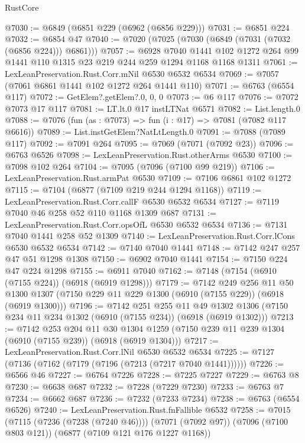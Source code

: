 \begin{lexlean}{RustCore}
\begin{coremodule}
@7030 := @6849 (@6851 @229 (@6962 (@6856 @229)))
@7031 := @6851 @224
@7032 := @6854 @47
@7040 := @7020 (@7025 (@7030 (@6849 (@7031 (@7032 (@6856 @224))) @6861)))
@7057 := @6928
    @7040
    @1441
    @102
    @1272
    @264
    @99
    @1441
    @110
    @1315
    @23
    @219
    @244
    @259
    @1294
    @1168
    @1168
    @1311
@7061 := LexLeanPreservation.Rust.Corr.mNil @6530 @6532 @6534
@7069 := @7057 (@7061 @6861 @1441 @102 @1272 @264 @1441 @110)
@7071 := @6763 (@6554 @117)
@7072 := GetElem?.getElem?.{0, 0, 0}
@7073 := @6 @117
@7076 := @7072 @7073 @17 @117
@7081 := LT.lt.{0} @17 instLTNat @6571
@7082 := List.length.{0}
@7088 := @7076 (fun (as : @7073) => fun (i : @17) => @7081 (@7082 @117 @6616))
@7089 := List.instGetElem?NatLtLength.{0}
@7091 := @7088 (@7089 @117)
@7092 := @7091 @264
@7095 := @7069 (@7071 (@7092 @23))
@7096 := @6763 @6526
@7098 := LexLeanPreservation.Rust.otherArms @6530
@7100 := @7098 @102 @264
@7104 := @7095 (@7096 (@7100 @99 @219))
@7106 := LexLeanPreservation.Rust.armPat @6530
@7109 := @7106 @6861 @102 @1272
@7115 := @7104 (@6877 (@7109 @219 @244 @1294 @1168))
@7119 := LexLeanPreservation.Rust.Corr.callF @6530 @6532 @6534
@7127 := @7119 @7040 @46 @258 @52 @110 @1168 @1309 @687
@7131 := LexLeanPreservation.Rust.Corr.opsOfL @6530 @6532 @6534
@7136 := @7131 @7040 @1441 @258 @52 @1309
@7140 := LexLeanPreservation.Rust.Corr.lCons @6530 @6532 @6534
@7142 := @7140 @7040 @1441
@7148 := @7142 @247 @257 @47 @51 @1298 @1308
@7150 := @6902 @7040 @1441
@7154 := @7150 @224 @47 @224 @1298
@7155 := @6911 @7040
@7162 := @7148 (@7154 (@6910 (@7155 @224)) (@6918 (@6919 @1298)))
@7179 := @7142
    @249
    @256
    @11
    @50
    @1300
    @1307
    (@7150 @229 @11 @229 @1300 (@6910 (@7155 @229)) (@6918 (@6919 @1300)))
@7196 := @7142
    @251
    @255
    @11
    @49
    @1302
    @1306
    (@7150 @234 @11 @234 @1302 (@6910 (@7155 @234)) (@6918 (@6919 @1302)))
@7213 := @7142
    @253
    @204
    @11
    @30
    @1304
    @1259
    (@7150 @239 @11 @239 @1304 (@6910 (@7155 @239)) (@6918 (@6919 @1304)))
@7217 := LexLeanPreservation.Rust.Corr.lNil @6530 @6532 @6534
@7225 := @7127 (@7136 (@7162 (@7179 (@7196 (@7213 (@7217 @7040 @1441))))))
@7226 := @6566 @46
@7227 := @6764 @7226
@7228 := @7225 @7227
@7229 := @6763 @8
@7230 := @6638 @687
@7232 := @7228 (@7229 @7230)
@7233 := @6763 @7
@7234 := @6662 @687
@7236 := @7232 (@7233 @7234)
@7238 := @6763 (@6554 @6526)
@7240 := LexLeanPreservation.Rust.fnFallible @6532
@7258 := @7015
    (@7115 (@7236 (@7238 (@7240 @46))))
    (@7071 (@7092 @97))
    (@7096 (@7100 @803 @121))
    (@6877 (@7109 @121 @176 @1227 @1168))

\end{coremodule}
\end{lexlean}
